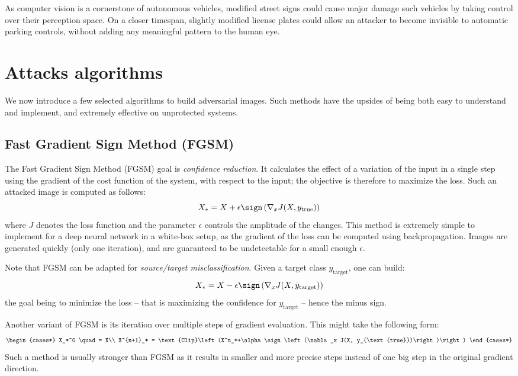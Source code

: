 \documentclass[twocolumn]{../cs-classes/cs-classes}
\begin{document}
As computer vision is a cornerstone of autonomous vehicles, modified street signs could cause major damage such vehicles by taking control over their perception space. On a closer timespan, slightly modified license plates could allow an attacker to become invisible to automatic parking controls, without adding any meaningful pattern to the human eye.

\section{Attacks algorithms}
\label{sec:attacks-algorithms}
We now introduce a few selected algorithms to build adversarial images. Such methods have the upsides of being both easy to understand and implement, and extremely effective on unprotected systems.

\subsection{Fast Gradient Sign Method (FGSM)}
The Fast Gradient Sign Method (FGSM) goal is \emph{confidence reduction}. It calculates the effect of a variation of the input in a single step using the gradient of the cost function of the system, with respect to the input; the objective is therefore to maximize the loss. Such an attacked image is computed as follows:
\begin{equation*}
    X_* = X + \epsilon\sign\left(\nabla_x J(X, y_{\text{true}})\right)
\end{equation*}
where $J$ denotes the loss function and the parameter $\epsilon$ controls the amplitude of the changes.
This method is extremely simple to implement for a deep neural network in a white-box setup, as the gradient of the loss can be computed using backpropagation. Images are generated quickly (only one iteration), and are guaranteed to be undetectable for a small enough $\epsilon$.

Note that FGSM can be adapted for \emph{source/target misclassification}. Given a target class $y_{\text{target}}$, one can build:
\begin{equation*}
    X_* = X - \epsilon\sign\left(\nabla_x J(X, y_{\text{target}})\right)
\end{equation*}
the goal being to minimize the loss -- that is maximizing the confidence for $y_{\text{target}}$ -- hence the minus sign.

Another variant of FGSM is its iteration over multiple steps of gradient evaluation. This might take the following form:
\begin{equation*}
    \begin{cases*}
        X_*^0 \quad= X\\
        X^{n+1}_* = \text{Clip}\left(X^n_*+\alpha\sign\left(\nabla_x J(X, y_{\text{true}})\right)\right)
    \end{cases*}
\end{equation*}
Such a method is usually stronger than FGSM as it results in smaller and more precise steps instead of one big step in the original gradient direction.
\end{document}
